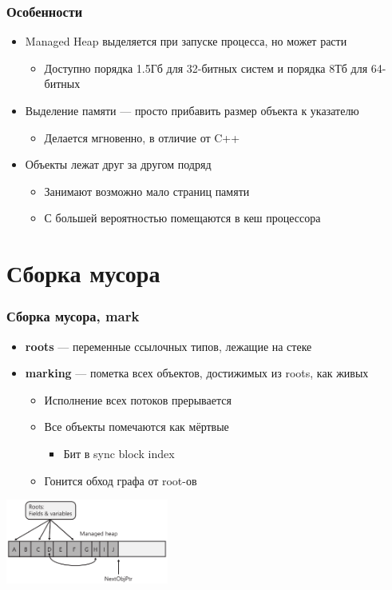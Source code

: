\documentclass[xetex,mathserif,serif]{beamer}
\begin{document}
	\begin{frame}
		\frametitle{Особенности}
		\begin{itemize}
			\item Managed Heap выделяется при запуске процесса, но может расти
			\begin{itemize}
				\item Доступно порядка 1.5Гб для 32-битных систем и порядка 8Тб для 64-битных
			\end{itemize}
			\item Выделение памяти --- просто прибавить размер объекта к указателю
			\begin{itemize}
				\item Делается мгновенно, в отличие от C++
			\end{itemize}
			\item Объекты лежат друг за другом подряд
			\begin{itemize}
				\item Занимают возможно мало страниц памяти
				\item С большей вероятностью помещаются в кеш процессора
			\end{itemize}
		\end{itemize}
	\end{frame}

	\section{Сборка мусора}

	\begin{frame}
		\frametitle{Сборка мусора, mark}
		\begin{itemize}
			\item \textbf{roots} --- переменные ссылочных типов, лежащие на стеке
			\item \textbf{marking} --- пометка всех объектов, достижимых из roots, как живых
			\begin{itemize}
				\item Исполнение всех потоков прерывается
				\item Все объекты помечаются как мёртвые
				\begin{itemize}
					\item Бит в sync block index
				\end{itemize}
				\item Гонится обход графа от root-ов
			\end{itemize}
		\end{itemize}
		\begin{center}
			\includegraphics[width=0.4\textwidth]{heapBeforeCollection.png}
		\end{center}
	\end{frame}
\end{document}
